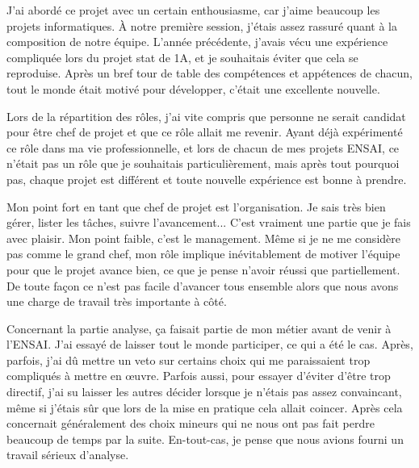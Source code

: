 \documentclass[11pt]{article}
\begin{document}
\bigbreak

J'ai abordé ce projet avec un certain enthousiasme, car j'aime beaucoup les projets informatiques. À notre première session, j'étais assez rassuré quant à la composition de notre équipe. L'année précédente, j'avais vécu une expérience compliquée lors du projet stat de 1A, et je souhaitais éviter que cela se reproduise. Après un bref tour de table des compétences et appétences de chacun, tout le monde était motivé pour développer, c'était une excellente nouvelle.

\bigbreak

Lors de la répartition des rôles, j'ai vite compris que personne ne serait candidat pour être chef de projet et que ce rôle allait me revenir. Ayant déjà expérimenté ce rôle dans ma vie professionnelle, et lors de chacun de mes projets ENSAI, ce n'était pas un rôle que je souhaitais particulièrement, mais après tout pourquoi pas, chaque projet est différent et toute nouvelle expérience est bonne à prendre.

\bigbreak

Mon point fort en tant que chef de projet est l'organisation. Je sais très bien gérer, lister les tâches, suivre l'avancement... C'est vraiment une partie que je fais avec plaisir. Mon point faible, c'est le management. Même si je ne me considère pas comme le grand chef, mon rôle implique inévitablement de motiver l'équipe pour que le projet avance bien, ce que je pense n'avoir réussi que partiellement. De toute façon ce n'est pas facile d'avancer tous ensemble alors que nous avons une charge de travail très importante à côté.

\bigbreak

Concernant la partie analyse, ça faisait partie de mon métier avant de venir à l'ENSAI. J'ai essayé de laisser tout le monde participer, ce qui a été le cas. Après, parfois, j'ai dû mettre un veto sur certains choix qui me paraissaient trop compliqués à mettre en œuvre. Parfois aussi, pour essayer d'éviter d'être trop directif, j'ai su laisser les autres décider lorsque je n'étais pas assez convaincant, même si j'étais sûr que lors de la mise en pratique cela allait coincer. Après cela concernait généralement des choix mineurs qui ne nous ont pas fait perdre beaucoup de temps par la suite. En-tout-cas, je pense que nous avions fourni un travail sérieux d'analyse.

\bigbreak
\end{document}
